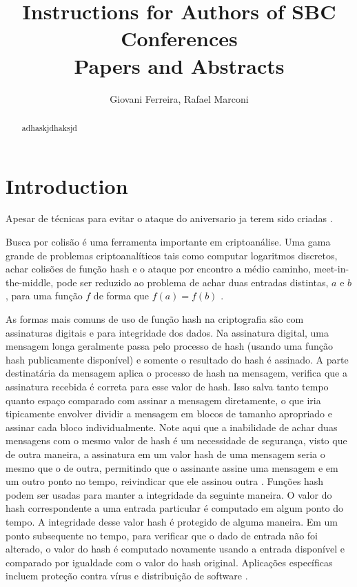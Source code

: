 \documentclass[12pt]{article}
\title{Instructions for Authors of SBC Conferences\\ Papers and Abstracts}
\author{Giovani Ferreira\inst{1}, Rafael Marconi\inst{1} }
\begin{document}
\maketitle

\begin{abstract}
adhaskjdhaksjd \cite{tanenbaum2002distributed}
\end{abstract}

\section{Introduction}

Apesar de técnicas para evitar o ataque do aniversario ja terem sido criadas \cite{aiello1996foiling}.

Busca por colisão é uma ferramenta importante em criptoanálise. Uma gama grande de problemas criptoanalíticos
tais como computar logaritmos discretos, achar colisões de função hash e o ataque por encontro a médio caminho,
meet-in-the-middle, pode ser reduzido ao problema de achar duas entradas distintas, \(a\) e \(b\), para uma
função \(f\) de forma que \(f(a) = f(b)\) \cite{van1999parallel}.


As formas mais comuns de uso de função hash na criptografia são com assinaturas digitais e para
integridade dos dados. Na assinatura digital, uma mensagem longa geralmente passa pelo processo
de hash (usando uma função hash publicamente disponível) e somente o resultado do hash é assinado.
A parte destinatária da mensagem aplica o processo de hash na mensagem, verifica que a assinatura
recebida é correta para esse valor de hash. Isso salva tanto tempo quanto espaço comparado com 
assinar a mensagem diretamente, o que iria tipicamente envolver dividir a mensagem em blocos de
tamanho apropriado e assinar cada bloco individualmente. Note aqui que a inabilidade de achar duas
mensagens com o mesmo valor de hash é um necessidade de segurança, visto que de outra maneira, a
assinatura em um valor hash de uma mensagem seria o mesmo que o de outra, permitindo que o assinante
assine uma mensagem e em um outro ponto no tempo, reivindicar que ele assinou outra \cite{menezes1996handbook}.
Funções hash podem ser usadas para manter a integridade da seguinte maneira. O valor do hash correspondente
a uma entrada particular é computado em algum ponto do tempo. A integridade desse valor hash é protegido
de alguma maneira. Em um ponto subsequente no tempo, para verificar que o dado de entrada não foi
alterado, o valor do hash é computado novamente usando a entrada disponível e comparado por igualdade
com o valor do hash original. Aplicações específicas incluem proteção contra vírus e distribuição de
software \cite{menezes1996handbook}.
\end{document}
